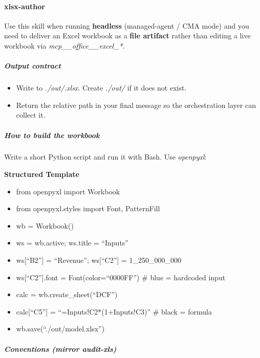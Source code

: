 \documentclass[11pt]{article}
\begin{document}
\paragraph{xlsx-author}\mbox{}\par

Use this skill when running \textbf{headless} (managed-agent / CMA mode) and you need to deliver an Excel workbook as a \textbf{file artifact} rather than editing a live workbook via \emph{mcp\_\allowbreak{}\_\allowbreak{}office\_\allowbreak{}\_\allowbreak{}excel\_\allowbreak{}*}.


\subparagraph{Output contract}\mbox{}\par

\begin{itemize}[leftmargin=*,itemsep=2pt,topsep=2pt]
\item {} Write to \emph{./out/.xlsx}. Create \emph{./out/} if it does not exist.
\item {} Return the relative path in your final message so the orchestration layer can collect it.
\end{itemize}

\subparagraph{How to build the workbook}\mbox{}\par

Write a short Python script and run it with Bash. Use \emph{openpyxl}:


\textbf{Structured Template}
\begin{itemize}[leftmargin=*,itemsep=2pt,topsep=2pt]
\item {} from openpyxl import Workbook
\item {} from openpyxl.styles import Font, PatternFill
\item {} wb = Workbook()
\item {} ws = wb.active; ws.title = ``Inputs''
\item {} ws[``B2''] = ``Revenue''; ws[``C2''] = 1\_\allowbreak{}250\_\allowbreak{}000\_\allowbreak{}000
\item {} ws[``C2''].font = Font(color=``0000FF'') \# blue = hardcoded input
\item {} calc = wb.create\_\allowbreak{}sheet(``DCF'')
\item {} calc[``C5''] = ``=Inputs!C2*(1+Inputs!C3)'' \# black = formula
\item {} wb.save(``./out/model.xlsx'')
\end{itemize}

\subparagraph{Conventions (mirror \emph{audit-xls})}\mbox{}\par
\end{document}

